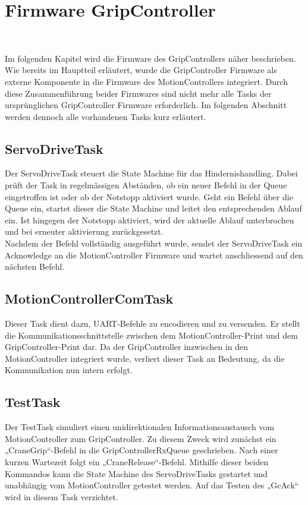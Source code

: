 \documentclass[main.tex]{subfiles} %
\begin{document}

\section{Firmware GripController}~\label{apdx:FirmwareGripController}

Im folgenden Kapitel wird die Firmware des GripControllers näher beschrieben. Wie bereits im Hauptteil
erläutert, wurde die GripController Firmware als externe Komponente in die Firmware des MotionControllers
integriert. Durch diese Zusammenführung beider Firmwares sind nicht mehr alle Tasks der ursprünglichen
GripController Firmware erforderlich. Im folgenden Abschnitt werden dennoch alle vorhandenen Tasks kurz erläutert.

\subsection{ServoDriveTask}
Der ServoDriveTask steuert die State Machine für das Hindernishandling. Dabei prüft der Task in
regelmässigen Abständen, ob ein neuer Befehl in der Queue eingetroffen ist oder ob der Notstopp
aktiviert wurde. Geht ein Befehl über die Queue ein, startet dieser die State Machine und leitet
den entsprechenden Ablauf ein. Ist hingegen der Notstopp aktiviert, wird der aktuelle Ablauf unterbrochen und
bei erneuter aktivierung zurückgesetzt.\\
Nachdem der Befehl vollständig ausgeführt wurde, sendet der ServoDriveTask ein Acknowledge an die
MotionController Firmware und wartet anschliessend auf den nächsten Befehl.
\subsection{MotionControllerComTask}
Dieser Task dient dazu, UART-Befehle zu encodieren und zu versenden. Er stellt die Kommunikationsschnittstelle
zwischen dem MotionController-Print und dem GripController-Print dar. Da der GripController inzwischen in den
MotionController integriert wurde, verliert dieser Task an Bedeutung, da die Kommunikation nun intern erfolgt.
\subsection{TestTask}
Der TestTask simuliert einen unidirektionalen Informationsaustausch vom MotionController zum GripController.
Zu diesem Zweck wird zunächst ein „CraneGrip“-Befehl in die GripControllerRxQueue geschrieben. Nach einer
kurzen Wartezeit folgt ein „CraneRelease“-Befehl. Mithilfe dieser beiden Kommandos kann die State Machine
des ServoDriveTasks gestartet und unabhängig vom MotionController getestet werden. Auf das Testen des
„GcAck“ wird in diesem Task verzichtet.
\end{document}
